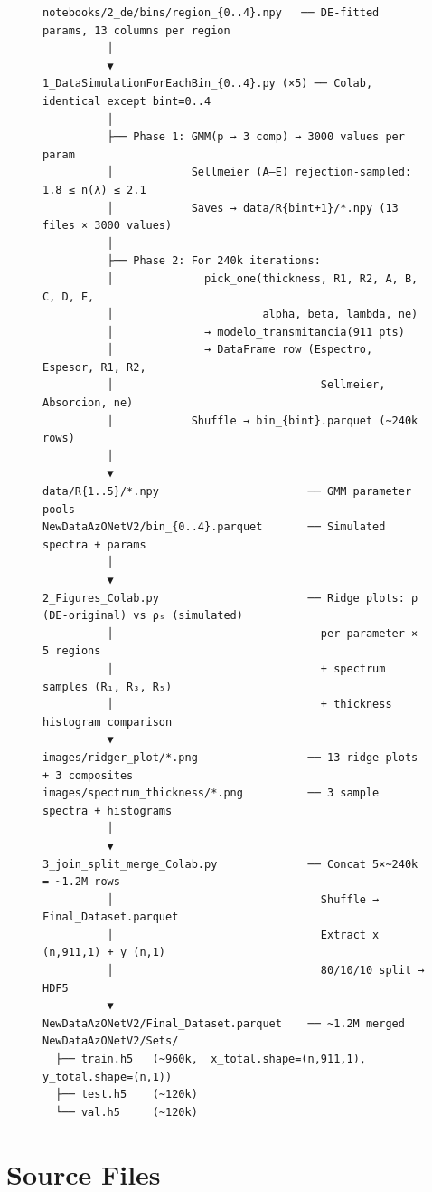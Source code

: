 \documentclass[11pt,a4paper]{article}
\begin{document}
\begin{figure}[htbp]
\centering
\small
\begin{verbatim}
notebooks/2_de/bins/region_{0..4}.npy   ── DE-fitted params, 13 columns per region
          │
          ▼
1_DataSimulationForEachBin_{0..4}.py (×5) ── Colab, identical except bint=0..4
          │
          ├── Phase 1: GMM(p → 3 comp) → 3000 values per param
          │            Sellmeier (A–E) rejection-sampled: 1.8 ≤ n(λ) ≤ 2.1
          │            Saves → data/R{bint+1}/*.npy (13 files × 3000 values)
          │
          ├── Phase 2: For 240k iterations:
          │              pick_one(thickness, R1, R2, A, B, C, D, E,
          │                       alpha, beta, lambda, ne)
          │              → modelo_transmitancia(911 pts)
          │              → DataFrame row (Espectro, Espesor, R1, R2,
          │                                Sellmeier, Absorcion, ne)
          │            Shuffle → bin_{bint}.parquet (~240k rows)
          │
          ▼
data/R{1..5}/*.npy                       ── GMM parameter pools
NewDataAzONetV2/bin_{0..4}.parquet       ── Simulated spectra + params
          │
          ▼
2_Figures_Colab.py                       ── Ridge plots: ρ (DE-original) vs ρₛ (simulated)
          │                                per parameter × 5 regions
          │                                + spectrum samples (R₁, R₃, R₅)
          │                                + thickness histogram comparison
          ▼
images/ridger_plot/*.png                 ── 13 ridge plots + 3 composites
images/spectrum_thickness/*.png          ── 3 sample spectra + histograms
          │
          ▼
3_join_split_merge_Colab.py              ── Concat 5×~240k = ~1.2M rows
          │                                Shuffle → Final_Dataset.parquet
          │                                Extract x (n,911,1) + y (n,1)
          │                                80/10/10 split → HDF5
          ▼
NewDataAzONetV2/Final_Dataset.parquet    ── ~1.2M merged
NewDataAzONetV2/Sets/
  ├── train.h5   (~960k,  x_total.shape=(n,911,1), y_total.shape=(n,1))
  ├── test.h5    (~120k)
  └── val.h5     (~120k)
\end{verbatim}
\end{figure}

\section{Source Files}
\end{document}
